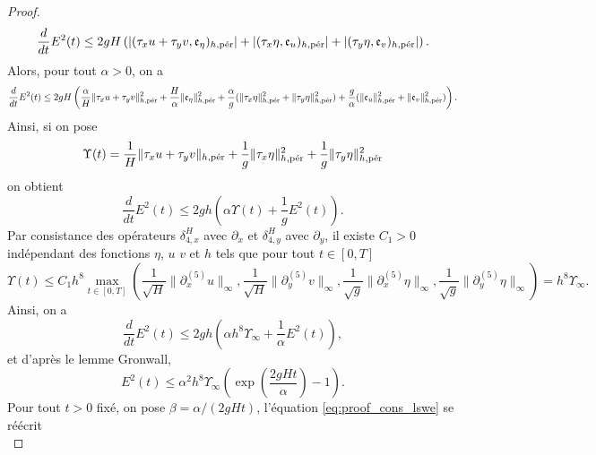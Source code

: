 \begin{proof}
\begin{equation}
\dfrac{d}{dt} E^2(t) \leq 2 g H \left( |(\tau_x u + \tau_y v, \mathfrak{e}_{\eta})_{h,\per}| + |(\tau_x \eta, \mathfrak{e}_u )_{h,\per}| + |(\tau_y \eta, \mathfrak{e}_v )_{h,\per}|  \right).
\end{equation}
Alors, pour tout $\alpha >0$, on a
\begin{equation}
\dfrac{d}{dt}E^2(t) \leq \\
2 gH \left( \dfrac{\alpha}{H} \| \tau_x u + \tau_y v \|_{h,\per}^2 + \dfrac{H}{\alpha} \| \mathfrak{e}_{\eta} \|_{h,\per}^2
+ \dfrac{\alpha}{g} (\| \tau_x \eta \|_{h,\per}^2 + \| \tau_y \eta \|_{h,\per}^2 ) + \dfrac{g}{\alpha} (\| \mathfrak{e}_u \|_{h,\per}^2 + \| \mathfrak{e}_v \|_{h,\per}^2)  \right).
\end{equation}
Ainsi, si on pose 
\begin{equation}
\Upsilon(t) = \dfrac{1}{H} \| \tau_x u + \tau_y v \|_{h,\per} + \dfrac{1}{g} \| \tau_x \eta \|_{h,\per}^2 + \dfrac{1}{g} \| \tau_y \eta \|_{h,\per}^2
\end{equation}
on obtient
\begin{equation}
\dfrac{d}{dt}E^2(t) \leq 2gh \left( \alpha \Upsilon(t) + \dfrac{1}{g} E^2(t) \right).
\end{equation}
Par consistance des opérateurs $\delta_{4,x}^H$ avec $\partial_x$ et $\delta_{4,y}^H$ avec $\partial_y$, il existe $C_1>0$ indépendant des fonctions $\eta$, $u$ $v$ et $h$ tels que pour tout $t \in [0,T]$
\begin{equation}
\Upsilon(t) \leq C_1 h^8 \max_{t \in [0,T]} \left( \dfrac{1}{\sqrt{H}} \| \partial_x^{(5)} u \|_{\infty}, \dfrac{1}{\sqrt{H}} \| \partial_y^{(5)} v \|_{\infty}, \dfrac{1}{\sqrt{g}} \| \partial_x^{(5)} \eta \|_{\infty}, \dfrac{1}{\sqrt{g}} \| \partial_y^{(5)} \eta \|_{\infty}  \right) = h^8 \Upsilon_{\infty}.
\end{equation}
Ainsi, on a
\begin{equation}
\dfrac{d}{dt}E^2(t) \leq 2gh \left( \alpha h^8 \Upsilon_{\infty} + \dfrac{1}{\alpha} E^2(t) \right),
\label{eq:proof_cons_lswe}
\end{equation}
et d'après le lemme Gronwall,
\begin{equation}
E^2(t) \leq \alpha^2 h^8 \Upsilon_{\infty} \left( \exp \left( \dfrac{2gHt}{\alpha}  \right) -1 \right).
\end{equation}
Pour tout $t>0$ fixé, on pose $\beta = \alpha /(2gHt)$, l'équation \eqref{eq:proof_cons_lswe} se réécrit
\begin{equation}

\end{equation}
\end{proof}
